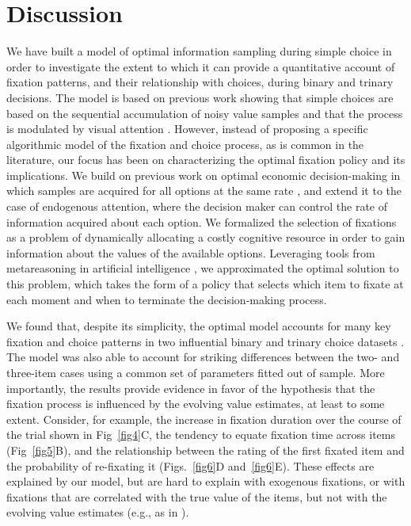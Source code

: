 \section{Discussion}

We have built a model of optimal information sampling during simple choice in order to investigate the extent to which it can provide a quantitative account of fixation patterns, and their relationship with choices, during binary and trinary decisions. The model is based on previous work showing that simple choices are based on the sequential accumulation of noisy value samples \citep{ratcliff1978theory,tajima2016optimal,ratcliff2008diffusion,teodorescu2013disentangling,busemeyer1993decision,holmes2016new} and that the process is modulated by visual attention \citep{krajbich2010visual,krajbich2011multialternative,gluth2018valuebaseda,gluth2020valuebased,song2019proactive,smith2018attention,armel2008biasing}. However, instead of proposing a specific algorithmic model of the fixation and choice process, as is common in the literature, our focus has been on characterizing the optimal fixation policy and its implications. We build on previous work on optimal economic decision-making in which samples are acquired for all options at the same rate \citep{tajima2016optimal,fudenberg2018speed,bogacz2006physics,tajima2019optimal}, and extend it to the case of endogenous attention, where the decision maker can control the rate of information acquired about each option. We formalized the selection of fixations as a problem of dynamically allocating a costly cognitive resource in order to gain information about the values of the available options. Leveraging tools from metareasoning in artificial intelligence \citep{matheson1968economic,russell1991principles,hay2012selecting,callaway2018learning}, we approximated the optimal solution to this problem, which takes the form of a policy that selects which item to fixate at each moment and when to terminate the decision-making process.

We found that, despite its simplicity, the optimal model accounts for many key fixation and choice patterns in two influential binary and trinary choice datasets \citep{krajbich2010visual,krajbich2011multialternative}. The model was also able to account for striking differences between the two- and three-item cases using a common set of parameters fitted out of sample. More importantly, the results provide evidence in favor of the hypothesis that the fixation process is influenced by the evolving value estimates, at least to some extent. Consider, for example, the increase in fixation duration over the course of the trial shown in Fig~\ref{fig4}C, the tendency to equate fixation time across items (Fig~\ref{fig5}B), and the relationship between the rating of the first fixated item and the probability of re-fixating it (Figs.~\ref{fig6}D and~\ref{fig6}E). These effects are explained by our model, but are hard to explain with exogenous fixations, or with fixations that are correlated with the true value of the items, but not with the evolving value estimates (e.g., as in \citep{towal2013simultaneous,stojic2020uncertainty,gluth2018valuebaseda}).

